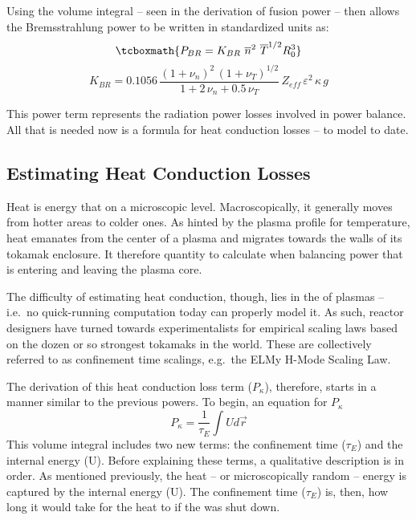 Using the volume integral -- seen in the derivation of fusion power -- then allows the Bremsstrahlung power to be written in standardized units as:
\begin{equation}
	\label{eq:pbr}
	\tcboxmath{
	P_{BR} = K_{BR} \ \overline n ^ 2 \ \overline T ^ {1/2} R_0^3
	}
\end{equation}
\begin{equation}
	K_{BR} = 0.1056 \, \frac{ (1+\nu_n)^2 \, (1+\nu_T)^{1/2} }{1+2 \, \nu_n + 0.5 \, \nu_T} \, Z_{eff} \, \varepsilon^2 \, \kappa \, g
\end{equation}

This power term represents the radiation power losses involved in power balance. All that is needed now is a formula for heat conduction losses --  to model to date.

\subsection{Estimating Heat Conduction Losses}

Heat is energy that  on a microscopic level. Macroscopically, it generally moves from hotter areas to colder ones. As hinted by the plasma profile for temperature, heat emanates from the center of a plasma and migrates towards the walls of its tokamak enclosure. It therefore  quantity to calculate when balancing power that is entering and leaving the plasma core.

The difficulty of estimating heat conduction, though, lies in the  of plasmas -- i.e.\ no quick-running computation today can properly model it. As such, reactor designers have turned towards experimentalists for empirical scaling laws based on the dozen or so strongest tokamaks in the world. These are collectively referred to as confinement time scalings, e.g.\ the ELMy H-Mode Scaling Law.

The derivation of this heat conduction loss term ($P_\kappa$), therefore, starts in a manner similar to the previous powers. To begin, an equation for $P_\kappa$ 
\begin{equation}
	P_\kappa = \frac{1}{\tau_E} \int U d \vec r
\end{equation}
This volume integral includes two new terms: the confinement time ($\tau_E$) and the internal energy (U). Before explaining these terms, a qualitative description is in order. As mentioned previously, the heat -- or microscopically random -- energy is captured by the internal energy (U). The confinement time ($\tau_E$) is, then, how long it would take for the heat to  if the  was shut down.

